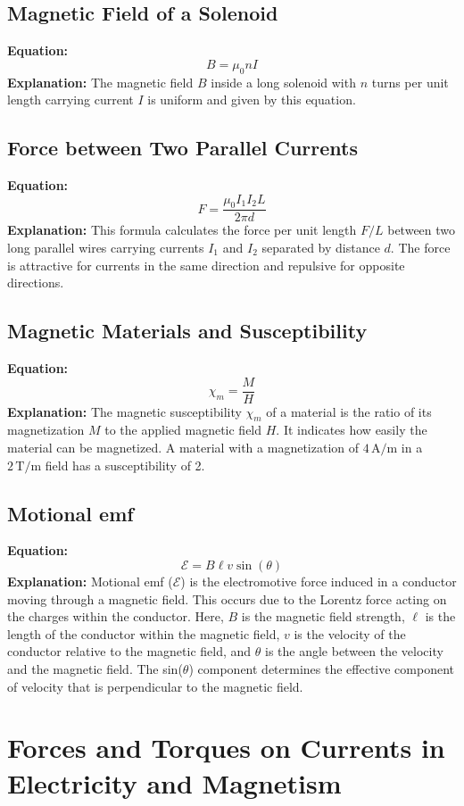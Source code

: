 \documentclass{article}
\begin{document}
\subsection*{Magnetic Field of a Solenoid}
\textbf{Equation:} 
\[ B = \mu_0 n I \]
\textbf{Explanation:} 
The magnetic field \( B \) inside a long solenoid with \( n \) turns per unit length carrying current \( I \) is uniform and given by this equation.

\subsection*{Force between Two Parallel Currents}
\textbf{Equation:} 
\[ F = \frac{\mu_0 I_1 I_2 L}{2\pi d} \]
\textbf{Explanation:} 
This formula calculates the force per unit length \( F/L \) between two long parallel wires carrying currents \( I_1 \) and \( I_2 \) separated by distance \( d \). The force is attractive for currents in the same direction and repulsive for opposite directions.

\subsection*{Magnetic Materials and Susceptibility}
\textbf{Equation:} 
\[ \chi_m = \frac{M}{H} \]
\textbf{Explanation:} 
The magnetic susceptibility \( \chi_m \) of a material is the ratio of its magnetization \( M \) to the applied magnetic field \( H \). It indicates how easily the material can be magnetized.
A material with a magnetization of \( 4 \, \text{A/m} \) in a \( 2 \, \text{T/m} \) field has a susceptibility of 2.

\subsection*{Motional emf}
\textbf{Equation:} 
\[ \mathcal{E} = B \ell v \sin(\theta) \]
\textbf{Explanation:} 
Motional emf (\( \mathcal{E} \)) is the electromotive force induced in a conductor moving through a magnetic field. This occurs due to the Lorentz force acting on the charges within the conductor. Here, \( B \) is the magnetic field strength, \( \ell \) is the length of the conductor within the magnetic field, \( v \) is the velocity of the conductor relative to the magnetic field, and \( \theta \) is the angle between the velocity and the magnetic field. The sin(\( \theta \)) component determines the effective component of velocity that is perpendicular to the magnetic field.

\section*{Forces and Torques on Currents in Electricity and Magnetism}
\end{document}
